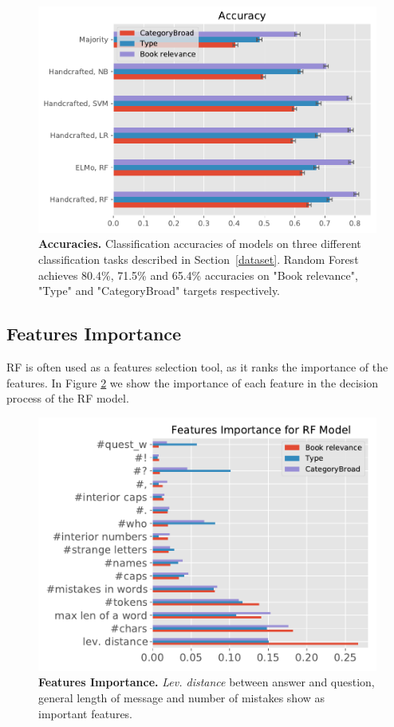 \documentclass[11pt,a4paper]{article}
\begin{document}
\begin{figure}[tbh]
    \centering
    \includegraphics[width = \linewidth]{../results/Accuracy_plot.pdf}
    \caption{\textbf{Accuracies.} Classification accuracies of models on three different classification tasks described in Section~\ref{dataset}. Random Forest achieves 80.4\%, 71.5\% and 65.4\% accuracies on "Book relevance", "Type" and "CategoryBroad" targets respectively.}
    \label{fig:acc_res}
\end{figure}

\subsection{Features Importance}
RF is often used as a features selection tool, as it ranks the importance of the features. In Figure \ref{fig:ft_imp_RF} we show the importance of each feature in the decision process of the RF model.

\begin{figure}[tbh]
    \centering
    \includegraphics[width = \linewidth]{../results/features_imp_RF_plot.pdf}
    \caption{\textbf{Features Importance.} \textit{Lev. distance} between answer and question, general length of message and number of mistakes show as important features.}
    \label{fig:ft_imp_RF}
\end{figure}
\end{document}
